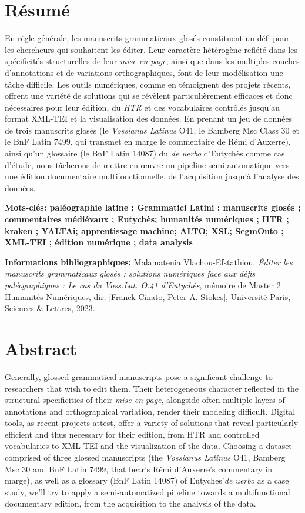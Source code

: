 \documentclass[a4paper, twoside, 12pt]{book}
\begin{document}
\section*{Résumé}
En règle générale, les manuscrits grammaticaux glosés constituent un défi pour les chercheurs qui souhaitent les éditer. Leur caractère hétérogène reflété dans les spécificités structurelles de leur \textit{mise en page}, ainsi que dans les multiples couches d'annotations et de variations orthographiques, font de leur modélisation une tâche difficile. Les outils numériques, comme en témoignent des projets récents, offrent une variété de solutions qui se révèlent particulièrement efficaces et donc nécessaires pour leur édition, du \textit{HTR} et des vocabulaires contrôlés jusqu'au format XML-TEI et la visualisation des données. En prenant un jeu de données de trois manuscrits glosés (le \textit{Vossianus Latinus} O41, le Bamberg Msc Class 30 et le BnF Latin 7499, qui transmet en marge le commentaire de Rémi d'Auxerre), ainsi qu'un glossaire (le BnF Latin 14087) du \textit{de uerbo} d'Eutychès comme cas d'étude, nous tâcherons de mettre en œuvre un pipeline semi-automatique vers une édition documentaire multifonctionnelle, de l'acquisition jusqu'à l'analyse des données.

\medskip

\textbf{Mots-clés: paléographie latine ; Grammatici Latini ; manuscrits glosés ; commentaires médiévaux ; Eutychès; humanités numériques ; HTR ; kraken ; YALTAi; apprentissage machine; ALTO; XSL; SegmOnto ; XML-TEI ; édition numérique ; data analysis}

\textbf{Informations bibliographiques:} Malamatenia Vlachou-Efstathiou, \textit{Éditer les manuscrits grammaticaux glosés : solutions numériques face aux défis paléographiques : Le cas du \textit{Voss.Lat. O.41} d'Eutychès}, mémoire de Master 2 \og Humanités Numériques\fg{}, dir. [Franck Cinato, Peter A. Stokes], Université Paris, Sciences \& Lettres, 2023.


\section*{Abstract}
Generally, glossed grammatical manuscripts pose a significant challenge to researchers that wish to edit them. Their heterogeneous character reflected in the structural specificities of their \textit{mise en page}, alongside often multiple layers of annotations and orthographical variation, render their modeling difficult. Digital tools, as recent projects attest, offer a variety of solutions that reveal particularly efficient and thus necessary for their edition, from HTR and controlled vocabularies to XML-TEI and the visualization of the data. Choosing a dataset comprised of three glossed manuscripts (the \textit{Vossianus Latinus} O41, Bamberg Msc 30 and BnF Latin 7499, that bear's Rémi d'Auxerre's commentary in marge), as well as a glossary (BnF Latin 14087) of Eutyches'\textit{de uerbo} as a case study, we'll try to apply a semi-automatized pipeline towards a multifunctional documentary edition, from the acquisition to the analysis of the data.
\end{document}
